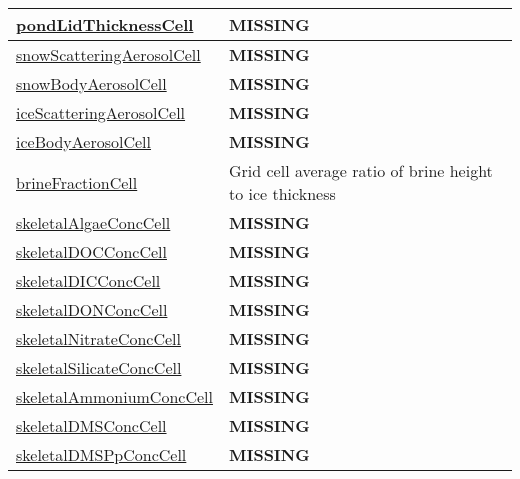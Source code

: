 {\begin{center}
\begin{longtable}{| p{2.0in} | p{4.0in} |}
    \hline
    \hyperref[subsec:var_sec_tracers_aggregate_pondLidThicknessCell]{pondLidThicknessCell} & {\bf \color{red} MISSING} \\
    \hline
    \hyperref[subsec:var_sec_tracers_aggregate_snowScatteringAerosolCell]{snowScatteringAerosolCell} & {\bf \color{red} MISSING} \\
    \hline
    \hyperref[subsec:var_sec_tracers_aggregate_snowBodyAerosolCell]{snowBodyAerosolCell} & {\bf \color{red} MISSING} \\
    \hline
    \hyperref[subsec:var_sec_tracers_aggregate_iceScatteringAerosolCell]{iceScatteringAerosolCell} & {\bf \color{red} MISSING} \\
    \hline
    \hyperref[subsec:var_sec_tracers_aggregate_iceBodyAerosolCell]{iceBodyAerosolCell} & {\bf \color{red} MISSING} \\
    \hline
    \hyperref[subsec:var_sec_tracers_aggregate_brineFractionCell]{brineFractionCell} & Grid cell average ratio of brine height to ice thickness \\
    \hline
    \hyperref[subsec:var_sec_tracers_aggregate_skeletalAlgaeConcCell]{skeletalAlgaeConcCell} & {\bf \color{red} MISSING} \\
    \hline
    \hyperref[subsec:var_sec_tracers_aggregate_skeletalDOCConcCell]{skeletalDOCConcCell} & {\bf \color{red} MISSING} \\
    \hline
    \hyperref[subsec:var_sec_tracers_aggregate_skeletalDICConcCell]{skeletalDICConcCell} & {\bf \color{red} MISSING} \\
    \hline
    \hyperref[subsec:var_sec_tracers_aggregate_skeletalDONConcCell]{skeletalDONConcCell} & {\bf \color{red} MISSING} \\
    \hline
    \hyperref[subsec:var_sec_tracers_aggregate_skeletalNitrateConcCell]{skeletalNitrateConcCell} & {\bf \color{red} MISSING} \\
    \hline
    \hyperref[subsec:var_sec_tracers_aggregate_skeletalSilicateConcCell]{skeletalSilicateConcCell} & {\bf \color{red} MISSING} \\
    \hline
    \hyperref[subsec:var_sec_tracers_aggregate_skeletalAmmoniumConcCell]{skeletalAmmoniumConcCell} & {\bf \color{red} MISSING} \\
    \hline
    \hyperref[subsec:var_sec_tracers_aggregate_skeletalDMSConcCell]{skeletalDMSConcCell} & {\bf \color{red} MISSING} \\
    \hline
    \hyperref[subsec:var_sec_tracers_aggregate_skeletalDMSPpConcCell]{skeletalDMSPpConcCell} & {\bf \color{red} MISSING} \\

\end{longtable}
\end{center}}
